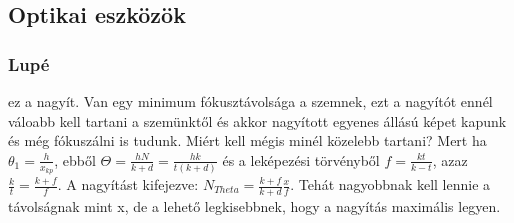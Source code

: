 \documentclass{article}
\begin{document}
\subsection{Optikai eszközök}
\subsubsection{Lupé}
ez a nagyít. Van egy minimum fókusztávolsága a szemnek, ezt a nagyítót ennél váloabb kell tartani a szemünktől és akkor nagyított egyenes állású képet kapunk és még fókuszálni is tudunk. Miért kell mégis minél közelebb tartani? Mert ha $\theta_1 = \frac{h}{x_{kp}}$, ebből $\Theta = \frac{hN}{k+d} = \frac{hk}{t(k+d)}$ és a leképezési törvényből $f=\frac{kt}{k-t}$, azaz $\frac{k}{t} = \frac{k+f}{f}$. A nagyítást kifejezve: $N_{Theta} = \frac{k+f}{k+d} \frac{x}{f}$. Tehát nagyobbnak kell lennie a távolságnak mint x, de a lehető legkisebbnek, hogy a nagyítás maximális legyen. 
\end{document}
